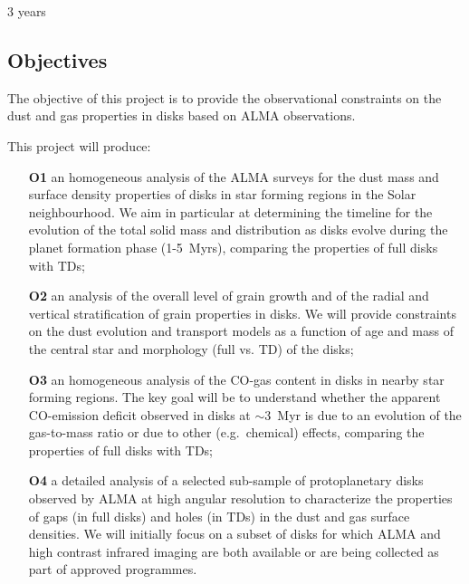 \documentclass[10pt,fleqn,twoside]{article}
\begin{document}
3 years

\subsection{Objectives}
\label{s_obj}


The objective of this project is to provide the observational constraints 
on the dust and gas properties in disks based on ALMA observations.


This project will produce:
\begin{itemize}
\item[{\bf O1}] an homogeneous analysis of the ALMA surveys for the dust mass and surface density properties of disks in star forming regions in the Solar neighbourhood. We aim in particular at determining the timeline for the evolution of the total solid mass and distribution as disks evolve during the planet formation phase (1-5~Myrs), comparing the properties of full disks with TDs;
\item[{\bf O2}] an analysis of the overall level of grain growth and of the radial and vertical stratification of grain properties in disks. We will provide constraints on the dust evolution and transport models as a function of age and mass of the central star and morphology (full vs. TD) of the disks;
\item[{\bf O3}] an homogeneous analysis of the CO-gas content in disks in nearby star forming regions. The key goal will be to understand whether the apparent CO-emission deficit observed in disks at $\sim$3~Myr is due to an evolution of the gas-to-mass ratio or due to other (e.g.\ chemical) effects, comparing the properties of full disks with TDs;
\item[{\bf O4}] a detailed analysis of a selected sub-sample of protoplanetary disks observed by ALMA at high angular resolution to characterize the properties of gaps (in full disks) and holes (in TDs) in the dust and gas surface densities. We will initially focus on a subset of disks for which ALMA and high contrast infrared imaging are both available or are being collected as part of approved programmes. 
\end{itemize}
\end{document}

